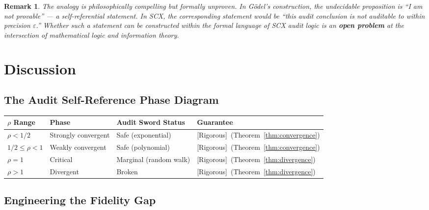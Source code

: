 \documentclass[12pt,a4paper]{article}
\newtheorem{remark}[theorem]{Remark}
\newcommand{\rigorous}{\textcolor{green!50!black}{\small\textsf{[Rigorous]}}}
\begin{document}
\begin{remark}
The analogy is philosophically compelling but formally unproven.  In G\"odel's
construction, the undecidable proposition is ``I am not provable'' — a
self-referential statement.  In SCX, the corresponding statement would be
``this audit conclusion is not auditable to within precision $\varepsilon$.''
Whether such a statement can be constructed within the formal language of SCX
audit logic is an \textbf{open problem} at the intersection of mathematical
logic and information theory.
\end{remark}

\section{Discussion}

\subsection{The Audit Self-Reference Phase Diagram}

\begin{center}
\begin{tabular}{@{}llll@{}}
\toprule
$\rho$ Range & Phase & Audit Sword Status & Guarantee \\
\midrule
$\rho<1/2$    & Strongly convergent    & Safe (exponential)     & \rigorous~(Theorem~\ref{thm:convergence}) \\
$1/2\leq\rho<1$ & Weakly convergent   & Safe (polynomial)      & \rigorous~(Theorem~\ref{thm:convergence}) \\
$\rho=1$      & Critical              & Marginal (random walk) & \rigorous~(Theorem~\ref{thm:divergence}) \\
$\rho>1$      & Divergent             & Broken                 & \rigorous~(Theorem~\ref{thm:divergence}) \\
\bottomrule
\end{tabular}
\end{center}

\subsection{Engineering the Fidelity Gap}
\end{document}
